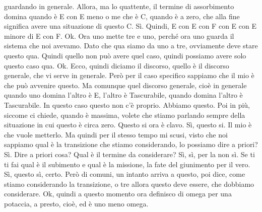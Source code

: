 \begin{soluzione}
{guardando in generale. Allora, ma lo quattente, il termine di assorbimento domina quando è E con E meno o me che è C, quando è a zero, che alla fine significa avere una situazione di questo C. Sì. Quindi, E con E con F con E con E minore di E con F. Ok. Ora uno mette tre e uno, perché ora uno guarda il sistema che noi avevamo. Dato che qua siamo da uno a tre, ovviamente deve stare questo qua. Quindi quello non può avere quel caso, quindi possiamo avere solo questo caso qua. Ok. Ecco, quindi diciamo il discorso, quello è il discorso generale, che vi serve in generale. Però per il caso specifico sappiamo che il mio è che può avvenire questo. Ma comunque quel discorso generale, cioè in generale quando uno domina l'altro è E, l'altro è Tascurabile, quando domina l'altro è Tascurabile. In questo caso questo non c'è proprio. Abbiamo questo. Poi in più, siccome ci chiede, quando è massima, volete che stiamo parlando sempre della situazione in cui questo è circa zero. Questo si ora è clavo. Sì, questo si. Il mio è che vuole metterlo. Ma quindi per il stesso tempo mi scusi, visto che noi sappiamo qual è la transizione che stiamo considerando, lo possiamo dire a priori? Sì. Dire a priori cosa? Qual è il termine da considerare? Sì, sì, per la non sì. Se ti ti fai qual è il subimento e qual è la missione, la fate del giunimento per il vero. Sì, questo sì, certo. Però di comuni, un intanto arriva a questo, poi dice, come stiamo considerando la transizione, o tre allora questo deve essere, che dobbiamo considerare. Ok, quindi a questo momento ora definisco di omega per una potaccia, a presto, cioè, ed è uno meno omega. 
   
}
\end{soluzione}
